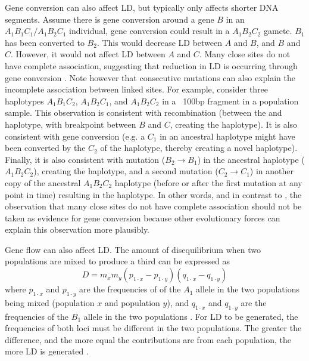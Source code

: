 Gene conversion can also affect LD, but typically only affects shorter DNA segments. Assume there is gene conversion around a gene $B$ in an $A_1B_1C_1/A_1B_2C_1$ individual, gene conversion could result in a $A_1B_2C_2$ gamete.
$B_1$ has been converted to $B_2$.
This would decrease LD between $A$ and $B$, and $B$ and $C$.
However, it would not affect LD between $A$ and $C$.
Many close sites do not have complete association, suggesting that reduction in LD is occurring through gene conversion \parencite{Ardlie2001}.
Note however that consecutive mutations can also explain the incomplete association between linked sites.
For example, consider three haplotypes $A_1B_1C_2$, $A_1B_2C_1$, and $A_1B_2C_2$ in a ~100bp fragment in a population sample.
This observation is consistent with recombination (between the  and  haplotype, with breakpoint between $B$ and $C$, creating the  haplotype).
It is also consistent with gene conversion (e.g. a $C_1$ in an ancestral  haplotype might have been converted by the $C_2$ of the  haplotype, thereby creating a novel  haplotype).
Finally, it is also consistent with mutation ($B_2 \rightarrow B_1$) in the ancestral  haplotype ($A_1B_2C_2$), creating the  haplotype, and a second mutation ($C_2 \rightarrow C_1$) in another copy of the ancestral $A_1B_2C_2$ haplotype (before or after the first mutation at any point in time) resulting in the  haplotype.
In other words, and in contrast to \cite{Ardlie2001}, the observation that many close sites do not have complete association should not be taken as evidence for gene conversion because other evolutionary forces can explain this observation more plausibly.

Gene flow can also affect LD.
The amount of disequilibrium when two populations are mixed to produce a third can be expressed as
\begin{equation}
D=m_xm_y(p_{1\cdot x}-p_{1\cdot y})(q_{1\cdot x}-q_{1\cdot y})
\end{equation}
where $p_{1\cdot x}$ and $p_{1\cdot y}$ are the frequencies of of the $A_1$ allele in the two populations being mixed (population $x$ and population $y$), and $q_{1\cdot x}$ and $q_{1\cdot y}$ are the frequencies of the $B_1$ allele in the two populations \parencite{Hedrick2010}.
For LD to be generated, the frequencies of both loci must be different in the two populations.
The greater the difference, and the more equal the contributions are from each population, the more LD is generated \parencite{Hedrick2010}. 
    
